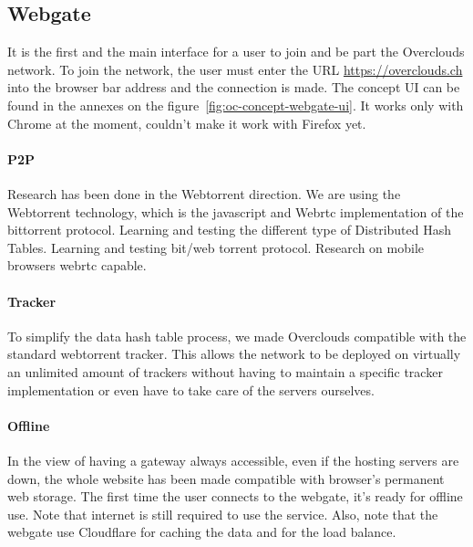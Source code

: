 
\subsection{Webgate} It is the first and the main interface for a user to join and be part the Overclouds network. To join the network, the user must enter the URL \url{https://overclouds.ch} into the browser bar address and the connection is made. The concept UI can be found in the annexes on the figure~\ref{fig:oc-concept-webgate-ui}. It works only with Chrome at the moment, couldn't make it work with Firefox yet.

\paragraph{P2P} Research has been done in the Webtorrent direction. We are using the Webtorrent\cite{Torrent2015WebTorrent} technology, which is the javascript and Webrtc implementation of the bittorrent protocol. Learning and testing the different type of Distributed Hash Tables. Learning and testing bit/web torrent protocol. Research on mobile browsers webrtc capable.

\paragraph{Tracker} To simplify the data hash table process, we made Overclouds compatible with the standard webtorrent tracker. This allows the network to be deployed on virtually an unlimited amount of trackers without having to maintain a specific tracker implementation or even have to take care of the servers ourselves. 

\paragraph{Offline} In the view of having a gateway always accessible, even if the hosting servers are down, the whole website has been made compatible with browser's permanent web storage. The first time the user connects to the webgate, it's ready for offline use. Note that internet is still required to use the service. Also, note that the webgate use Cloudflare for caching the data and for the load balance.

